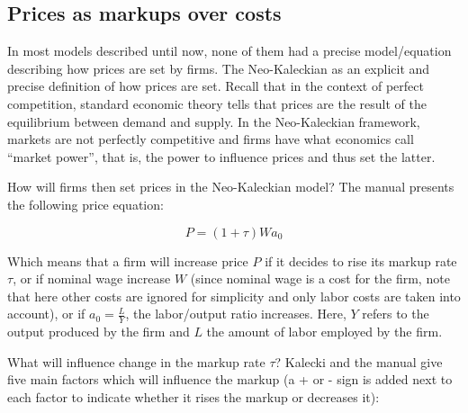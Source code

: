 \documentclass[
  letterpaper,
  DIV=11,
  numbers=noendperiod]{scrreprt}
\begin{document}
\hypertarget{prices-as-markups-over-costs}{%
\subsection{Prices as markups over
costs}\label{prices-as-markups-over-costs}}

In most models described until now, none of them had a precise
model/equation describing how prices are set by firms. The Neo-Kaleckian
as an explicit and precise definition of how prices are set. Recall that
in the context of perfect competition, standard economic theory tells
that prices are the result of the equilibrium between demand and supply.
In the Neo-Kaleckian framework, markets are not perfectly competitive
and firms have what economics call ``market power'', that is, the power
to influence prices and thus set the latter.

How will firms then set prices in the Neo-Kaleckian model? The manual
presents the following price equation:

\[P = (1 + \tau)Wa_0\]

Which means that a firm will increase price \(P\) if it decides to rise
its markup rate \(\tau\), or if nominal wage increase \(W\) (since
nominal wage is a cost for the firm, note that here other costs are
ignored for simplicity and only labor costs are taken into account), or
if \(a_0 = \frac{L}{Y}\), the labor/output ratio increases. Here, \(Y\)
refers to the output produced by the firm and \(L\) the amount of labor
employed by the firm.

What will influence change in the markup rate \(\tau\)? Kalecki and the
manual give five main factors which will influence the markup (a + or -
sign is added next to each factor to indicate whether it rises the
markup or decreases it):
\end{document}
